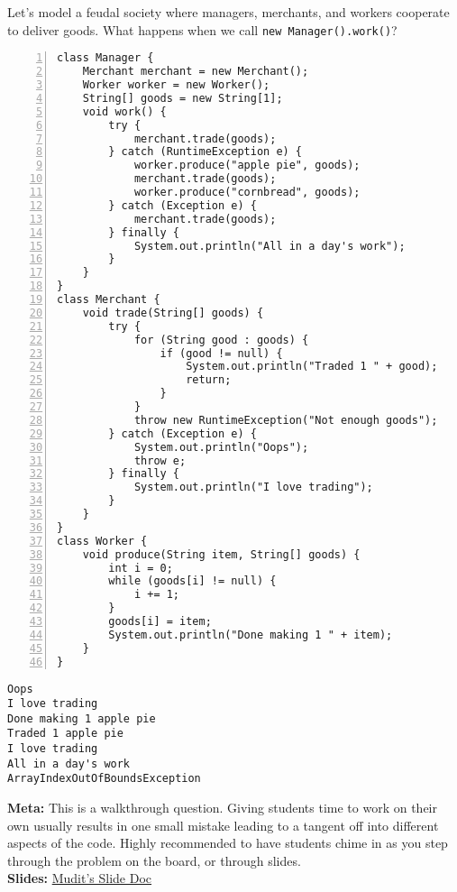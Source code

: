 \question Let's model a feudal society where managers, merchants, and workers cooperate to deliver goods. What happens when we call \texttt{new Manager().work()}?

\begin{lstlisting}[basicstyle=\ttfamily\footnotesize,
                   numberstyle=\ttfamily\tiny, numbers=left]
class Manager {
    Merchant merchant = new Merchant();
    Worker worker = new Worker();
    String[] goods = new String[1];
    void work() {
        try {
            merchant.trade(goods);
        } catch (RuntimeException e) {
            worker.produce("apple pie", goods);
            merchant.trade(goods);
            worker.produce("cornbread", goods);
        } catch (Exception e) {
            merchant.trade(goods);
        } finally {
            System.out.println("All in a day's work");
        }
    }
}
class Merchant {
    void trade(String[] goods) {
        try {
            for (String good : goods) {
                if (good != null) {
                    System.out.println("Traded 1 " + good);
                    return;
                }
            }
            throw new RuntimeException("Not enough goods");
        } catch (Exception e) {
            System.out.println("Oops");
            throw e;
        } finally {
            System.out.println("I love trading");
        }
    }
}
class Worker {
    void produce(String item, String[] goods) {
        int i = 0;
        while (goods[i] != null) {
            i += 1;
        }
        goods[i] = item;
        System.out.println("Done making 1 " + item);
    }
}
\end{lstlisting}

\begin{solution}
\begin{verbatim}
Oops
I love trading
Done making 1 apple pie
Traded 1 apple pie
I love trading
All in a day's work
ArrayIndexOutOfBoundsException
\end{verbatim}
\textbf{Meta:} This is a walkthrough question. Giving students time to work
on their own usually results in one small mistake leading to a tangent off into
different aspects of the code. Highly recommended to have students chime in
as you step through the problem on the board, or through slides. \\
\textbf{Slides:} \href{foo}{Mudit's Slide Doc}


\end{solution}
